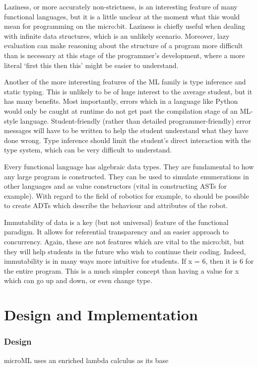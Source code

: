 \documentclass[12pt, a4paper]{report}
\begin{document}
Laziness, or more accurately non-strictness,  is an interesting feature of many functional languages, 
but it is a little unclear at the moment what this would mean for programming on the micro:bit. 
Laziness is chiefly useful when dealing with infinite data structures, which is an unlikely
scenario. Moreover, lazy evaluation can make reasoning about the structure of a program more
difficult than is necessary at this stage of the programmer's development, where a more literal
`first this then this' might be easier to understand. 

Another of the more interesting features of the ML family is type inference and static typing. This
is unlikely to be of huge interest to the average student, but it has many benefits. Most
importantly, errors which in a language like Python would only be caught at runtime do not get past
the compilation stage of an ML-style language. Student-friendly (rather than detailed
programmer-friendly) error messages will have to be
written to help the student understand what they have done wrong. Type inference should limit the
student's direct interaction with the type system, which can be very difficult to understand.

Every functional language has algebraic data types. They are fundamental to how any large program is
constructed. They can be used to simulate enumerations in other languages and as value constructors
(vital in constructing ASTs for example). With regard to the field of robotics for example, to
should be possible to create ADTs which describe the behaviour and attributes of the robot.

Immutability of data is a key (but not universal) feature of the functional paradigm. It allows for
referential transparency and an easier approach to concurrency. Again, these are not features which
are vital to the micro:bit, but they will help students in the future who wish to continue their
coding. Indeed, immutability is in many ways more intuitive for students. If x = 6, then it is 6 for
the entire program. This is a much simpler concept than having a value for x which can go up and down,
or even change type.


\chapter{Design and Implementation}

\subsection{Design}
microML uses an enriched lambda calculus as its base
\vspace{5mm}
\end{document}
